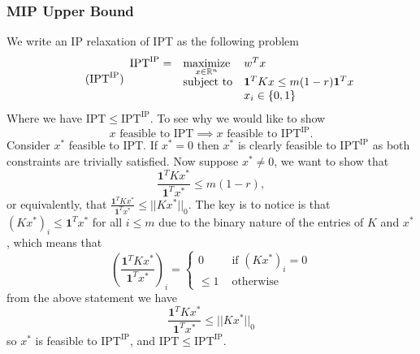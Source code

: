 \documentclass[12pt]{article}
\newcommand{\priv}{\text{IPT}}
\newcommand{\privuip}{\text{IPT}^\text{IP}}
\begin{document}
\subsubsection{\gls{MIP} Upper Bound}
We write an IP relaxation of \gls{IPT} as the following problem
\begin{equation}
	\label{eq:privuip} 
    \tag{$\privuip$} 
	\begin{array}{lll}
		\privuip = & \underset{x\in\mr^n}{\text{maximize}} & w^T x \\
		& \mbox{subject to} & \mathbf{1}^TKx \leq m(1-r)\mathbf{1}^Tx \\
        && x_i \in \{0,1\}
		\end{array}
\end{equation}
Where we have $\priv \leq \privuip$. To see why we would like to show
\[x \text{ feasible to } \priv \implies x \text{ feasible to } \privuip.\]
Consider $x^*$ feasible to $\priv$. If $x^* =0$ then $x^*$ is clearly feasible to $\privuip$ as both constraints are trivially satisfied. Now suppose $x^*\neq 0$, we want to show that \[\frac{\mathbf{1}^TKx^*}{\mathbf{1}^Tx^*} \leq m(1-r),\] or equivalently, that $\frac{\mathbf{1}^TKx^*}{\mathbf{1}^Tx^*} \leq ||Kx^*||_0$. The key is to notice is that $(Kx^*)_i \leq \mathbf{1}^Tx^*$ for all $i\leq m$ due to the binary nature of the entries of $K$ and $x^*$, which means that 
\[\left(\frac{\mathbf{1}^TKx^*}{\mathbf{1}^Tx^*}\right)_i = 
\begin{cases}
    0 & \text{ if } (Kx^*)_i = 0 \\
    \leq 1 & \text{ otherwise}
\end{cases}
\]
from the above statement we have
\[\frac{\mathbf{1}^TKx^*}{\mathbf{1}^Tx^*} \leq ||Kx^*||_0\]
so $x^*$ is feasible to $\privuip$, and $\priv \leq \privuip$.
\end{document}
